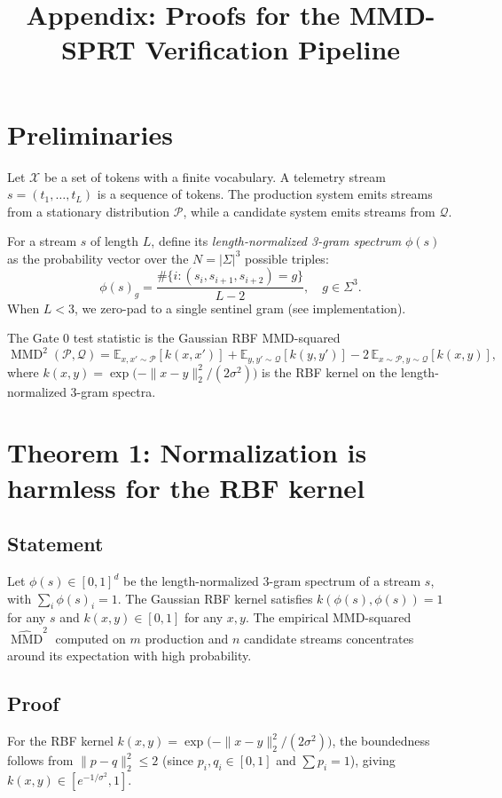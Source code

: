 \documentclass{article}
\begin{document}
\title{Appendix: Proofs for the MMD-SPRT Verification Pipeline}
\author{}
\date{}
\maketitle

\section{Preliminaries}

Let $\mathcal{X}$ be a set of tokens with a finite vocabulary.
A telemetry stream $s = (t_1,\dots,t_L)$ is a sequence of tokens.
The production system emits streams from a stationary distribution $\mathcal{P}$,
while a candidate system emits streams from $\mathcal{Q}$.

For a stream $s$ of length $L$, define its \emph{length-normalized 3-gram spectrum}
$\phi(s)$ as the probability vector over the $N = |\Sigma|^3$ possible triples:
\[
\phi(s)_g = \frac{\#\{i: (s_i,s_{i+1},s_{i+2}) = g\}}{L - 2}, \quad g \in \Sigma^3.
\]
When $L < 3$, we zero-pad to a single sentinel gram (see implementation).

The Gate 0 test statistic is the Gaussian RBF MMD-squared
\[
\operatorname{MMD}^2(\mathcal{P},\mathcal{Q}) =
\mathbb{E}_{x,x'\sim\mathcal{P}}[k(x,x')] +
\mathbb{E}_{y,y'\sim\mathcal{Q}}[k(y,y')] -
2\,\mathbb{E}_{x\sim\mathcal{P},y\sim\mathcal{Q}}[k(x,y)],
\]
where $k(x,y) = \exp\bigl(-\|x-y\|_2^2 / (2\sigma^2)\bigr)$ is the RBF kernel
on the length-normalized 3-gram spectra.

\section{Theorem 1: Normalization is harmless for the RBF kernel}

\subsection{Statement}
Let $\phi(s) \in [0,1]^d$ be the length-normalized 3-gram spectrum of a stream $s$,
with $\sum_i \phi(s)_i = 1$.  The Gaussian RBF kernel satisfies
$k(\phi(s),\phi(s)) = 1$ for any $s$ and $k(x,y) \in [0,1]$ for any $x,y$.
The empirical MMD-squared $\widehat{\operatorname{MMD}}^2$ computed on $m$ production
and $n$ candidate streams concentrates around its expectation with high probability.

\subsection{Proof}
For the RBF kernel $k(x,y) = \exp\bigl(-\|x-y\|_2^2 / (2\sigma^2)\bigr)$,
the boundedness follows from $\|p-q\|_2^2 \leq 2$ (since $p_i,q_i \in [0,1]$
and $\sum p_i = 1$), giving $k(x,y) \in [e^{-1/\sigma^2}, 1]$.
\end{document}
